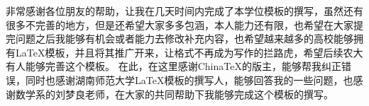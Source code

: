 \Thanks
{}
非常感谢各位朋友的帮助，让我在几天时间内完成了本学位模板的撰写，虽然还有很多不完善的地方，但是还希望大家多多包涵，本人能力还有限，也希望在大家提完问题之后我能够有机会或者能力去修改补充内容，也希望越来越多的高校能够拥有\LaTeX 模板，并且将其推广开来，让格式不再成为写作的拦路虎，希望后续农大有人能够完善这个模板。
在此，在这里感谢ChinaTeX的版主，能够帮我纠正错误，同时也感谢湖南师范大学\LaTeX 模板的撰写人，能够回答我的一些问题，也感谢数学系的刘梦良老师，在大家的共同帮助下我能够完成这个模板的撰写。